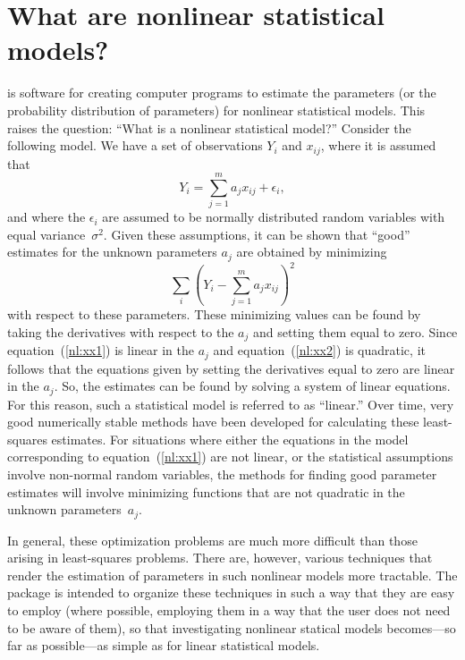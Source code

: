 \documentclass{admbmanual}
\begin{document}
\section{What are nonlinear statistical models?}

\ADMS is software for creating computer programs to 
estimate the parameters (or the probability distribution of
parameters) for nonlinear statistical models. 
This raises the question: ``What is a nonlinear statistical
model?''  Consider the following model. We have a set
of observations $Y_i$ and $x_{ij}$, where it is assumed that
\begin{equation}
{Y_i=\sum_{j=1}^m a_j x_{ij}+\epsilon_i}\label{nl:xx1},
\end{equation}
and where the $\epsilon_i$ are assumed to be normally distributed
random variables with equal variance~$\sigma^2$.
Given these assumptions, it can be shown that ``good''
estimates for the unknown parameters $a_j$ are obtained by minimizing
\begin{equation}
{ \sum_i \left(Y_i-\sum_{j=1}^m a_jx_{ij} \right)^2}\label{nl:xx2}
\end{equation}
with respect to these parameters.
These minimizing values can be found by taking the
derivatives with respect to the $a_j$ and setting them equal to
zero. 
Since equation~(\ref{nl:xx1}) is linear in the $a_j$ and equation~(\ref{nl:xx2})
is quadratic, it follows that the equations given by setting the
derivatives equal to zero are linear in the $a_j$. So, the 
estimates can be found by solving a system of linear
equations. 
For this reason, such a statistical model
is referred to as ``linear.''
Over time, very good numerically stable methods have
been developed for calculating these least-squares estimates.
For situations where either
the equations in the model corresponding to equation~(\ref{nl:xx1})
are not linear, or the statistical assumptions involve
non-normal random variables, the methods for finding
good parameter estimates will involve minimizing functions
that are not quadratic in the unknown parameters~$a_j$.

In general, these optimization problems are much more
difficult than those arising in least-squares problems.
There are, however, various techniques that render the
estimation of parameters in such nonlinear models
more tractable. The \ADMS package is intended to
organize these techniques in such a way that they
are easy to employ (where possible,
employing them in a way that the user does
not need to be aware of them), so that investigating
nonlinear statical models becomes---so far as possible---as simple as for linear statistical models.
\end{document}
